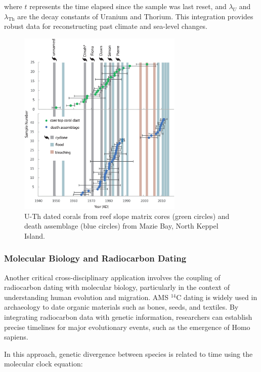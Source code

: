 \documentclass{article}
\begin{document}
where \( t \) represents the time elapsed since the sample was last reset, and \(\lambda_U\) and \(\lambda_{\text{Th}}\) are the decay constants of Uranium and Thorium. This integration provides robust data for reconstructing past climate and sea-level changes.

\begin{figure}
    \centering
    \includegraphics[width=0.7\textwidth]{UTh.jpg}
    \caption{U-Th dated corals from reef slope matrix cores (green circles) and death assemblage (blue circles) from Mazie Bay, North Keppel Island.}
    \label{fig:UTh}
\end{figure}

\subsubsection*{Molecular Biology and Radiocarbon Dating}

Another critical cross-disciplinary application involves the coupling of radiocarbon dating with molecular biology, particularly in the context of understanding human evolution and migration. AMS \(^{14}\text{C}\) dating is widely used in archaeology to date organic materials such as bones, seeds, and textiles. By integrating radiocarbon data with genetic information, researchers can establish precise timelines for major evolutionary events, such as the emergence of Homo sapiens.

In this approach, genetic divergence between species is related to time using the molecular clock equation:
\end{document}
